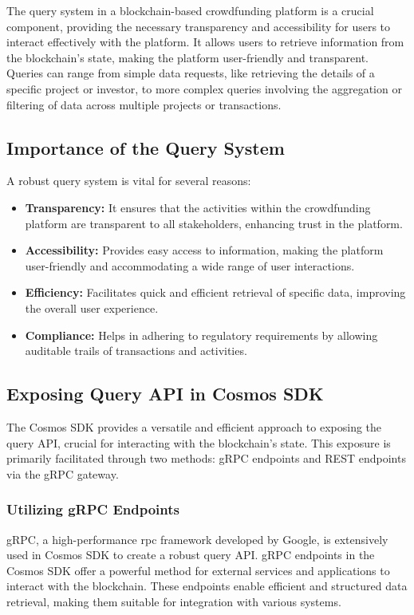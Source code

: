 The query system in a blockchain-based crowdfunding platform is a crucial component, providing the necessary transparency and accessibility for users to interact effectively with the platform. It allows users to retrieve information from the blockchain's state, making the platform user-friendly and transparent. Queries can range from simple data requests, like retrieving the details of a specific project or investor, to more complex queries involving the aggregation or filtering of data across multiple projects or transactions.

\subsection{Importance of the Query System}

A robust query system is vital for several reasons:
\begin{itemize}
    \item \textbf{Transparency:} It ensures that the activities within the crowdfunding platform are transparent to all stakeholders, enhancing trust in the platform.
    \item \textbf{Accessibility:} Provides easy access to information, making the platform user-friendly and accommodating a wide range of user interactions.
    \item \textbf{Efficiency:} Facilitates quick and efficient retrieval of specific data, improving the overall user experience.
    \item \textbf{Compliance:} Helps in adhering to regulatory requirements by allowing auditable trails of transactions and activities.
\end{itemize}

\subsection{Exposing Query API in Cosmos SDK}

The Cosmos SDK provides a versatile and efficient approach to exposing the query API, crucial for interacting with the blockchain's state. This exposure is primarily facilitated through two methods: gRPC endpoints and REST endpoints via the gRPC gateway.

\subsubsection{Utilizing gRPC Endpoints}

gRPC, a high-performance \gls{rpc} framework developed by Google, is extensively used in Cosmos SDK to create a robust query API. gRPC endpoints in the Cosmos SDK offer a powerful method for external services and applications to interact with the blockchain. These endpoints enable efficient and structured data retrieval, making them suitable for integration with various systems.


